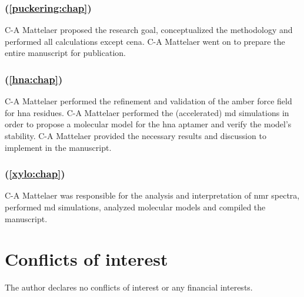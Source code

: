 \subsubsection{ (\cref{puckering:chap})}

C-A Mattelaer proposed the research goal, conceptualized the methodology and performed all calculations except \gls{cena}. C-A Mattelaer went on to prepare the entire manuscript for publication.

\subsubsection{ (\cref{hna:chap})}

C-A Mattelaer performed the refinement and validation of the \gls{amber} force field for \gls{hna} residues. C-A Mattelaer performed the (accelerated) \gls{md} simulations in order to propose a molecular model for the \gls{hna} aptamer and verify the model's stability. C-A Mattelaer provided the necessary results and discussion to implement in the manuscript.

\subsubsection{ (\cref{xylo:chap})}

C-A Mattelaer was responsible for the analysis and interpretation of \gls{nmr} spectra, performed \gls{md} simulations, analyzed molecular models and compiled the manuscript.

\section{Conflicts of interest}

The author declares no conflicts of interest or any financial interests.
